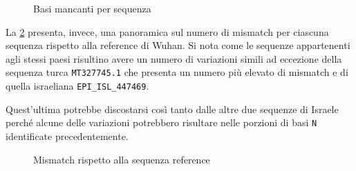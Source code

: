 \documentclass[11pt,italian]{article}
\begin{document}
\begin{figure}[H]
  \caption{Basi mancanti per sequenza}
  \label{fig:plot-missing}
\end{figure}

\noindent
La \cref{fig:plot-mismatch} presenta, invece, una panoramica sul numero di mismatch per ciascuna sequenza rispetto alla reference di Wuhan. Si nota come le sequenze appartenenti agli stessi paesi risultino avere un numero di variazioni simili ad eccezione della sequenza turca \lstinline{MT327745.1} che presenta un numero più elevato di mismatch e di quella israeliana \lstinline{EPI_ISL_447469}.

Quest'ultima potrebbe discostarsi così tanto dalle altre due sequenze di Israele perché alcune delle variazioni potrebbero risultare nelle porzioni di basi \lstinline{N} identificate precedentemente.

\begin{figure}[H]
  \caption{Mismatch rispetto alla sequenza reference}
  \label{fig:plot-mismatch}
\end{figure}
\end{document}
